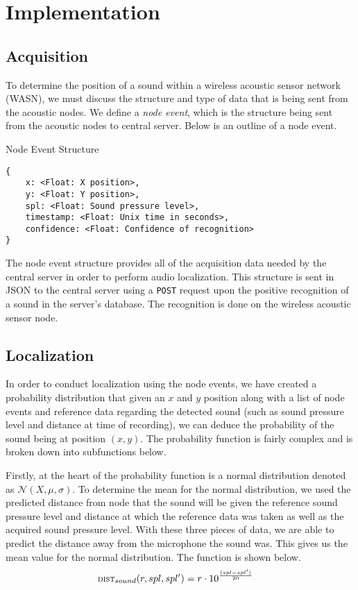 \documentclass[12pt]{article}
\newcommand{\Normal}[3]{\mathcal{N}(#1, #2, #3)}
\newcommand{\Function}[1]{\ensuremath{{\small \textsc{#1}}}}
\begin{document}
\maketitle

\section{Implementation}

\subsection{Acquisition}

To determine the position of a sound within a wireless acoustic sensor network
(WASN), we must discuss the structure and type of data that is being sent from
the acoustic nodes. We define a \emph{node event}, which is the structure being
sent from the acoustic nodes to central server. Below is an outline of a node
event.


\begin{program}
\caption{Node Event Structure}
\begin{verbatim}
{
    x: <Float: X position>,
    y: <Float: Y position>,
    spl: <Float: Sound pressure level>,
    timestamp: <Float: Unix time in seconds>,
    confidence: <Float: Confidence of recognition>
}
\end{verbatim}
\end{program}

The node event structure provides all of the acquisition data needed by the
central server in order to perform audio localization. This structure is sent
in JSON to the central server using a \verb|POST| request upon the positive
recognition of a sound in the server's database. The recognition is done on the
wireless acoustic sensor node.

\subsection{Localization}

In order to conduct localization using the node events, we have created a
probability distribution that given an $x$ and $y$ position along with a list
of node events and reference data regarding the detected sound (such as sound
pressure level and distance at time of recording), we can deduce the
probability of the sound being at position $(x, y)$. The probability function
is fairly complex and is broken down into subfunctions below.

Firstly, at the heart of the probability function is a normal distribution
denoted as $\Normal{X}{\mu}{\sigma}$. To determine the mean for the normal
distribution, we used the predicted distance from node that the sound will be
given the reference sound pressure level and distance at which the reference
data was taken as well as the acquired sound pressure level. With these three
pieces of data, we are able to predict the distance away from the microphone
the sound was. This gives us the mean value for the normal distribution. The
function is shown below.  \begin{align*} \Function{dist}_{sound}(r, spl, spl')
&= r \cdot 10 ^ {\frac{(spl - spl')}{20}} \end{align*}
\end{document}
